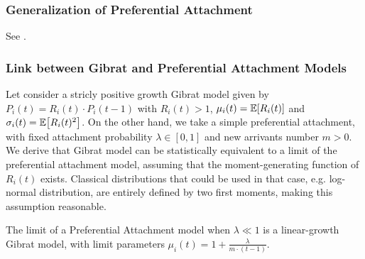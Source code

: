 \subsubsection{Generalization of Preferential Attachment}

See \cite{yamasaki2006preferential}.

\subsubsection{Link between Gibrat and Preferential Attachment Models}

Let consider a stricly positive growth Gibrat model given by $P_i(t)=R_i(t)\cdot P_{i}(t-1)$ with $R_i(t)>1$, $\mu_i(t)=\operatorname{\mathbb{E}}\!\left[R_i(t)\right]$ and $\sigma_i(t)=\operatorname{\mathbb{E}}\!\left[R_i(t)^2\right]$. On the other hand, we take a simple preferential attachment, with fixed attachment probability $\lambda \in [0,1]$ and new arrivants number $m>0$. We derive that Gibrat model can be statistically equivalent to a limit of the preferential attachment model, assuming that the moment-generating function of $R_i(t)$ exists. Classical distributions that could be used in that case, e.g. log-normal distribution, are entirely defined by two first moments, making this assumption reasonable.

\begin{lemma}
The limit of a Preferential Attachment model when $\lambda \ll 1$ is a linear-growth Gibrat model, with limit parameters $\mu_i(t)=1+\frac{\lambda}{m\cdot (t-1)}$.
\end{lemma}

